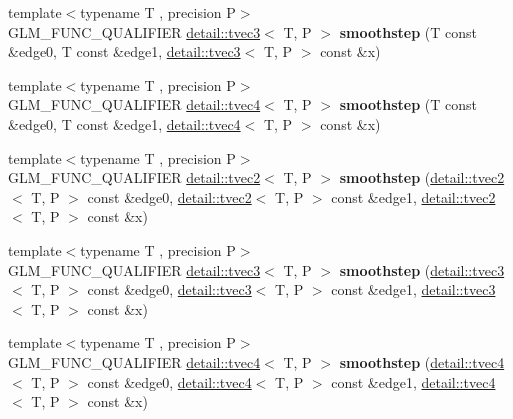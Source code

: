 \begin{DoxyCompactItemize}
\item 
{\footnotesize template$<$typename T , precision P$>$ }\\G\+L\+M\+\_\+\+F\+U\+N\+C\+\_\+\+Q\+U\+A\+L\+I\+F\+I\+ER \hyperlink{structglm_1_1detail_1_1tvec3}{detail\+::tvec3}$<$ T, P $>$ {\bfseries smoothstep} (T const \&edge0, T const \&edge1, \hyperlink{structglm_1_1detail_1_1tvec3}{detail\+::tvec3}$<$ T, P $>$ const \&x)\hypertarget{namespaceglm_a70ce610b837517f7cf8a82316b2b662c}{}\label{namespaceglm_a70ce610b837517f7cf8a82316b2b662c}

\item 
{\footnotesize template$<$typename T , precision P$>$ }\\G\+L\+M\+\_\+\+F\+U\+N\+C\+\_\+\+Q\+U\+A\+L\+I\+F\+I\+ER \hyperlink{structglm_1_1detail_1_1tvec4}{detail\+::tvec4}$<$ T, P $>$ {\bfseries smoothstep} (T const \&edge0, T const \&edge1, \hyperlink{structglm_1_1detail_1_1tvec4}{detail\+::tvec4}$<$ T, P $>$ const \&x)\hypertarget{namespaceglm_ab64e62cbb8d64da4f3fc8a2abaff1684}{}\label{namespaceglm_ab64e62cbb8d64da4f3fc8a2abaff1684}

\item 
{\footnotesize template$<$typename T , precision P$>$ }\\G\+L\+M\+\_\+\+F\+U\+N\+C\+\_\+\+Q\+U\+A\+L\+I\+F\+I\+ER \hyperlink{structglm_1_1detail_1_1tvec2}{detail\+::tvec2}$<$ T, P $>$ {\bfseries smoothstep} (\hyperlink{structglm_1_1detail_1_1tvec2}{detail\+::tvec2}$<$ T, P $>$ const \&edge0, \hyperlink{structglm_1_1detail_1_1tvec2}{detail\+::tvec2}$<$ T, P $>$ const \&edge1, \hyperlink{structglm_1_1detail_1_1tvec2}{detail\+::tvec2}$<$ T, P $>$ const \&x)\hypertarget{namespaceglm_a5eaf205dc0b9126303cbb1c7593b4665}{}\label{namespaceglm_a5eaf205dc0b9126303cbb1c7593b4665}

\item 
{\footnotesize template$<$typename T , precision P$>$ }\\G\+L\+M\+\_\+\+F\+U\+N\+C\+\_\+\+Q\+U\+A\+L\+I\+F\+I\+ER \hyperlink{structglm_1_1detail_1_1tvec3}{detail\+::tvec3}$<$ T, P $>$ {\bfseries smoothstep} (\hyperlink{structglm_1_1detail_1_1tvec3}{detail\+::tvec3}$<$ T, P $>$ const \&edge0, \hyperlink{structglm_1_1detail_1_1tvec3}{detail\+::tvec3}$<$ T, P $>$ const \&edge1, \hyperlink{structglm_1_1detail_1_1tvec3}{detail\+::tvec3}$<$ T, P $>$ const \&x)\hypertarget{namespaceglm_aa88da2d789f89fe917cbcd5855706707}{}\label{namespaceglm_aa88da2d789f89fe917cbcd5855706707}

\item 
{\footnotesize template$<$typename T , precision P$>$ }\\G\+L\+M\+\_\+\+F\+U\+N\+C\+\_\+\+Q\+U\+A\+L\+I\+F\+I\+ER \hyperlink{structglm_1_1detail_1_1tvec4}{detail\+::tvec4}$<$ T, P $>$ {\bfseries smoothstep} (\hyperlink{structglm_1_1detail_1_1tvec4}{detail\+::tvec4}$<$ T, P $>$ const \&edge0, \hyperlink{structglm_1_1detail_1_1tvec4}{detail\+::tvec4}$<$ T, P $>$ const \&edge1, \hyperlink{structglm_1_1detail_1_1tvec4}{detail\+::tvec4}$<$ T, P $>$ const \&x)\hypertarget{namespaceglm_a0eb15c7d255088706c5b00f7214512e0}{}\label{namespaceglm_a0eb15c7d255088706c5b00f7214512e0}


\end{DoxyCompactItemize}
